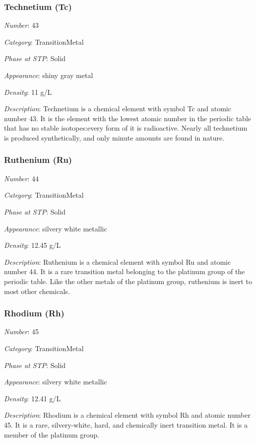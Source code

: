 \documentclass{article}
\begin{document}
\hypertarget{subsubsection::Tc}{}\subsubsection{Technetium (Tc)}

\textit{Number}: 43

\textit{Category}: TransitionMetal

\textit{Phase at STP}: Solid

\textit{Appearance}: shiny gray metal

\textit{Density}: 11 g/L

\textit{Description}: Technetium is a chemical element with symbol Tc and atomic number 43. It is the element with the lowest atomic number in the periodic table that has no stable isotopes:every form of it is radioactive. Nearly all technetium is produced synthetically, and only minute amounts are found in nature.

\hypertarget{subsubsection::Ru}{}\subsubsection{Ruthenium (Ru)}

\textit{Number}: 44

\textit{Category}: TransitionMetal

\textit{Phase at STP}: Solid

\textit{Appearance}: silvery white metallic

\textit{Density}: 12.45 g/L

\textit{Description}: Ruthenium is a chemical element with symbol Ru and atomic number 44. It is a rare transition metal belonging to the platinum group of the periodic table. Like the other metals of the platinum group, ruthenium is inert to most other chemicals.

\hypertarget{subsubsection::Rh}{}\subsubsection{Rhodium (Rh)}

\textit{Number}: 45

\textit{Category}: TransitionMetal

\textit{Phase at STP}: Solid

\textit{Appearance}: silvery white metallic

\textit{Density}: 12.41 g/L

\textit{Description}: Rhodium is a chemical element with symbol Rh and atomic number 45. It is a rare, silvery-white, hard, and chemically inert transition metal. It is a member of the platinum group.
\end{document}
